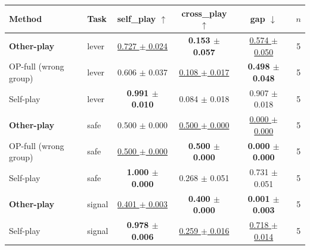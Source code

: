 \begin{tabular}{llcccc}
\toprule
Method & Task & self\_play $\uparrow$ & cross\_play $\uparrow$ & gap $\downarrow$ & $n$ \\
\midrule
\textbf{Other-play} & lever & \underline{0.727 $\pm$ 0.024} & \textbf{0.153 $\pm$ 0.057} & \underline{0.574 $\pm$ 0.050} & 5 \\
OP-full (wrong group) & lever & 0.606 $\pm$ 0.037 & \underline{0.108 $\pm$ 0.017} & \textbf{0.498 $\pm$ 0.048} & 5 \\
Self-play & lever & \textbf{0.991 $\pm$ 0.010} & 0.084 $\pm$ 0.018 & 0.907 $\pm$ 0.018 & 5 \\
\midrule
\textbf{Other-play} & safe & 0.500 $\pm$ 0.000 & \underline{0.500 $\pm$ 0.000} & \underline{0.000 $\pm$ 0.000} & 5 \\
OP-full (wrong group) & safe & \underline{0.500 $\pm$ 0.000} & \textbf{0.500 $\pm$ 0.000} & \textbf{0.000 $\pm$ 0.000} & 5 \\
Self-play & safe & \textbf{1.000 $\pm$ 0.000} & 0.268 $\pm$ 0.051 & 0.731 $\pm$ 0.051 & 5 \\
\midrule
\textbf{Other-play} & signal & \underline{0.401 $\pm$ 0.003} & \textbf{0.400 $\pm$ 0.000} & \textbf{0.001 $\pm$ 0.003} & 5 \\
Self-play & signal & \textbf{0.978 $\pm$ 0.006} & \underline{0.259 $\pm$ 0.016} & \underline{0.718 $\pm$ 0.014} & 5 \\
\bottomrule
\end{tabular}
